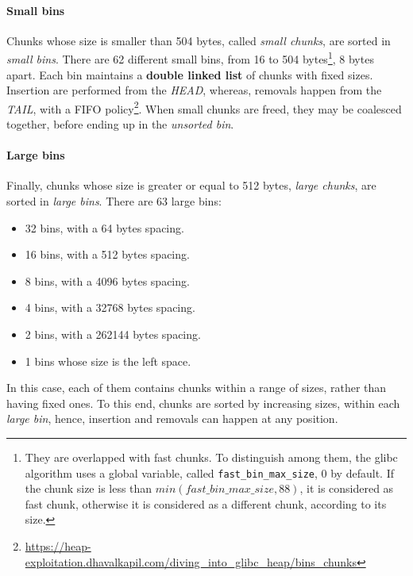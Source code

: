 \documentclass{article}
\numberwithin{equation}{subsection}
\begin{document}
\paragraph{Small bins}
Chunks whose size is smaller than 504 bytes, called \emph{small chunks}, are sorted in \emph{small bins}. There are 62 different small bins, from 16 to 504 bytes\footnote{They are overlapped with fast chunks. To distinguish among them, the glibc algorithm uses a global variable, called \texttt{fast\_bin\_max\_size}, 0 by default. If the chunk size is less than ${min(fast\_bin\_max\_size, 88)}$, it is considered as fast chunk, otherwise it is considered as a different chunk, according to its size.}, 8 bytes apart. Each bin maintains a \textbf{double linked list} of chunks with fixed sizes. Insertion are performed from the \emph{HEAD}, whereas, removals happen from the \emph{TAIL}, with a FIFO policy\footnote{\href{https://heap-exploitation.dhavalkapil.com/diving_into_glibc_heap/bins_chunks}{https://heap-exploitation.dhavalkapil.com/diving\_into\_glibc\_heap/bins\_chunks}}. When small chunks are freed, they may be coalesced together, before ending up in the \emph{unsorted bin}.
\paragraph{Large bins}
Finally, chunks whose size is greater or equal to 512 bytes, \emph{large chunks}, are sorted in \emph{large bins}. There are 63 large bins: 
\begin{itemize}
    \item 32 bins, with a 64 bytes spacing.
    \item 16 bins, with a 512 bytes spacing.
    \item 8 bins, with a 4096 bytes spacing.
    \item 4 bins, with a 32768 bytes spacing.
    \item 2 bins, with a 262144 bytes spacing.
    \item 1 bins whose size is the left space.
\end{itemize}
In this case, each of them contains chunks within a range of sizes, rather than having fixed ones. To this end, chunks are sorted by increasing sizes, within each \emph{large bin}, hence, insertion and removals can happen at any position. 
\end{document}

